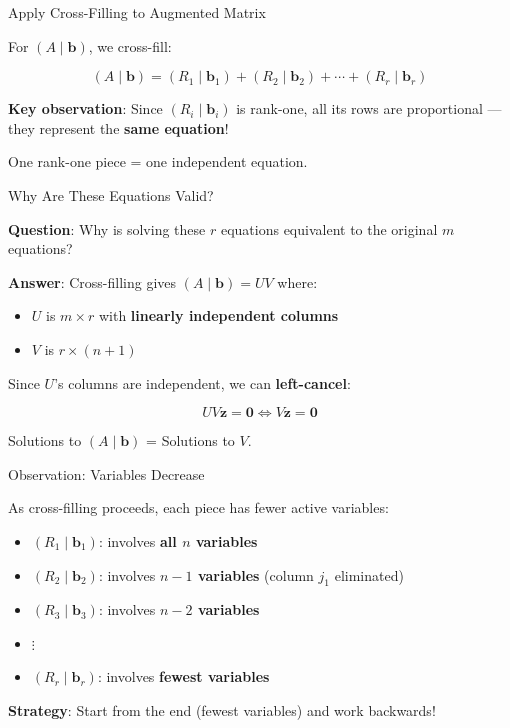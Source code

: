 \documentclass[10pt]{beamer}
\theoremstyle{definition}
\newcommand{\x}[1]{\alert{\textbf{#1}}}
\begin{document}
\begin{frame}{Apply Cross-Filling to Augmented Matrix}

For $(A \mid \mathbf{b})$, we cross-fill:

$$(A \mid \mathbf{b}) = (R_1 \mid \mathbf{b}_1) + (R_2 \mid \mathbf{b}_2) + \cdots + (R_r \mid \mathbf{b}_r)$$

\vspace{1em}

\x{Key observation}: Since $(R_i \mid \mathbf{b}_i)$ is rank-one, all its rows are proportional — they represent the \x{same equation}!

\vspace{1em}

One rank-one piece = one independent equation.

\end{frame}

\begin{frame}{Why Are These Equations Valid?}

\x{Question}: Why is solving these $r$ equations equivalent to the original $m$ equations?

\vspace{1em}

\x{Answer}: Cross-filling gives $(A \mid \mathbf{b}) = UV$ where:
\begin{itemize}
\item $U$ is $m \times r$ with \textbf{linearly independent columns}
\item $V$ is $r \times (n+1)$
\end{itemize}

Since $U$'s columns are independent, we can \x{left-cancel}:

$$UV\mathbf{z} = \mathbf{0} \iff V\mathbf{z} = \mathbf{0}$$

Solutions to $(A \mid \mathbf{b})$ = Solutions to $V$.

\end{frame}

\begin{frame}{Observation: Variables Decrease}

As cross-filling proceeds, each piece has fewer active variables:

\begin{itemize}
\item $(R_1 \mid \mathbf{b}_1)$: involves \x{all $n$ variables}
\item $(R_2 \mid \mathbf{b}_2)$: involves \x{$n-1$ variables} (column $j_1$ eliminated)
\item $(R_3 \mid \mathbf{b}_3)$: involves \x{$n-2$ variables}
\item $\vdots$
\item $(R_r \mid \mathbf{b}_r)$: involves \x{fewest variables}
\end{itemize}

\vspace{1em}

\x{Strategy}: Start from the end (fewest variables) and work backwards!

\end{frame}
\end{document}
